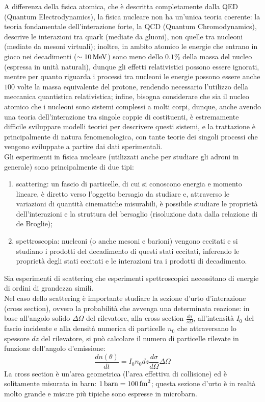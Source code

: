 A differenza della fisica atomica, che è descritta completamente dalla QED (Quantum Electrodynamics), la fisica nucleare non ha un'unica teoria coerente: la teoria fondamentale dell'interazione forte, la QCD (Quantum Chromodynamics), descrive le interazioni tra quark (mediate da gluoni), non quelle tra nucleoni (mediate da mesoni virtuali); inoltre, in ambito atomico le energie che entrano in gioco nei decadimenti ($ \sim 10\,\text{MeV} $) sono meno dello $ 0.1\% $ della massa del nucleo (espressa in unità naturali), dunque gli effetti relativistici possono essere ignorati, mentre per quanto riguarda i processi tra nucleoni le energie possono essere anche $ 100 $ volte la massa equivalente del protone, rendendo necessario l'utilizzo della meccanica quantistica relativistica; infine, bisogna considerare che sia il nucleo atomico che i nucleoni sono sistemi complessi a molti corpi, dunque, anche avendo una teoria dell'interazione tra singole coppie di costituenti, è estremamente difficile sviluppare modelli teorici per descrivere questi sistemi, e la trattazione è principalmente di natura fenomenologica, con tante teorie dei singoli processi che vengono sviluppate a partire dai dati sperimentali.\\
Gli esperimenti in fisica nucleare (utilizzati anche per studiare gli adroni in generale) sono principalmente di due tipi:
\begin{enumerate}
  \item scattering: un fascio di particelle, di cui si conoscono energia e momento lineare, è diretto verso l'oggetto bersagio da studiare e, attraverso le variazioni di quantità cinematiche misurabili, è possibile studiare le proprietà dell'interazioni e la struttura del bersaglio (risoluzione data dalla relazione di de Broglie);
  \item spettroscopia: nucleoni (o anche mesoni e barioni) vengono eccitati e si studiano i prodotti del decadimento di questi stati eccitati, inferendo le proprietà degli stati eccitati e le interazioni tra i prodotti di decadimento.
\end{enumerate}
Sia esperimenti di scattering che esperimenti spettroscopici necessitano di energie di ordini di grandezza simili.\\
Nel caso dello scattering è importante studiare la sezione d'urto d'interazione (cross section), ovvero la probabilità che avvenga una determinata reazione: in base all'angolo solido $ \Delta\Omega $ del rilevatore, alla cross section $ \frac{d\sigma}{s\Omega} $, all'intensità $ I_0 $ del fascio incidente e alla densità numerica di particelle $ n_0 $ che attraversano lo spessore $ dz $ del rilevatore, si può calcolare il numero di particelle rilevate in funzione dell'angolo d'emissione:
\begin{equation}
  \frac{dn(\theta)}{dt} = I_0 n_0 dz \frac{d\sigma}{d\Omega} \Delta\Omega
  \label{eq:1}
\end{equation}
La cross section è un'area geometrica (l'area effettiva di collisione) ed è solitamente misurata in barn: $ 1\,\text{barn} = 100\,\text{fm}^2 $; questa sezione d'urto è in realtà molto grande e misure più tipiche sono espresse in microbarn.

\thispagestyle{introd}
